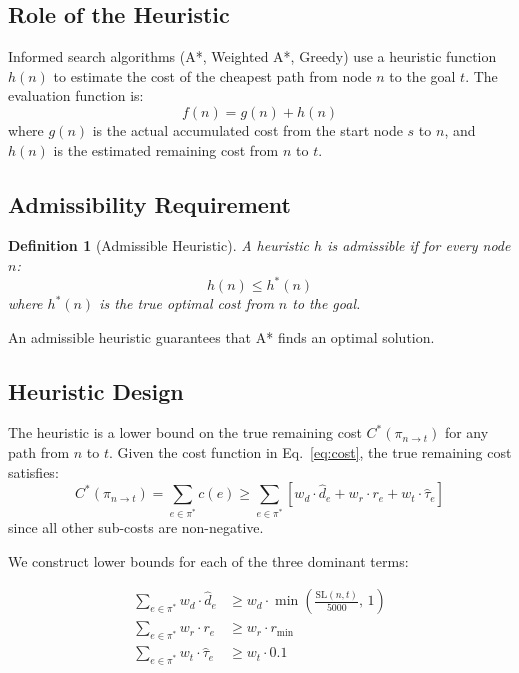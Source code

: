 ﻿\documentclass[a4paper, 12pt]{article}
\newtheorem{definition}{Definition}
\theoremstyle{remark}
\begin{document}
\subsection{Role of the Heuristic}

Informed search algorithms (A*, Weighted A*, Greedy) use a heuristic function $h(n)$ to estimate the cost of the cheapest path from node $n$ to the goal $t$. The evaluation function is:
\[
    f(n) = g(n) + h(n)
\]
where $g(n)$ is the actual accumulated cost from the start node $s$ to $n$, and $h(n)$ is the estimated remaining cost from $n$ to $t$.

\subsection{Admissibility Requirement}

\begin{definition}[Admissible Heuristic]
A heuristic $h$ is \emph{admissible} if for every node $n$:
\[
    h(n) \leq h^*(n)
\]
where $h^*(n)$ is the true optimal cost from $n$ to the goal.
\end{definition}

An admissible heuristic guarantees that A* finds an optimal solution.

\subsection{Heuristic Design}

The heuristic is a lower bound on the true remaining cost $C^*(\pi_{n \to t})$ for any path from $n$ to $t$. Given the cost function in Eq.~\ref{eq:cost}, the true remaining cost satisfies:
\[
    C^*(\pi_{n \to t}) = \sum_{e \in \pi^*} c(e)
    \geq \sum_{e \in \pi^*} \left[ w_d \cdot \hat{d}_e + w_r \cdot r_e + w_t \cdot \hat{\tau}_e \right]
\]
since all other sub-costs are non-negative.

We construct lower bounds for each of the three dominant terms:

\begin{align}
\sum_{e \in \pi^*} w_d \cdot \hat{d}_e
    &\geq w_d \cdot \min\!\left(\frac{\text{SL}(n,t)}{5000},\, 1\right)
    \label{eq:h_dist} \\
\sum_{e \in \pi^*} w_r \cdot r_e
    &\geq w_r \cdot r_{\min}
    \label{eq:h_risk} \\
\sum_{e \in \pi^*} w_t \cdot \hat{\tau}_e
    &\geq w_t \cdot 0.1
    \label{eq:h_traffic}
\end{align}
\end{document}
